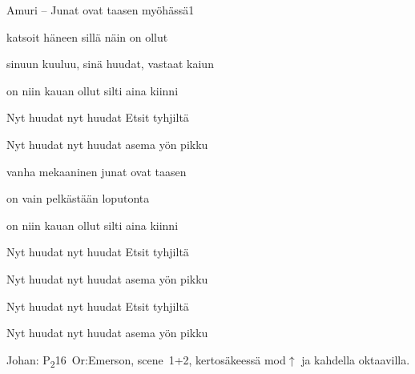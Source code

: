 \documentclass[12pt,a4paper]{article}
\begin{document}
\thispagestyle{empty}
\begin{mysong}{Amuri – Junat ovat taasen myöhässä}{1}


\begin{SBVerse}
   katsoit häneen sillä   näin on
  ollut 

   sinuun kuuluu, sinä   huudat, vastaat
  kaiun 

   on niin kauan ollut   silti aina
  kiinni 
\end{SBVerse}

\begin{SBChorus}
  Nyt huudat  nyt huudat  Etsit
   tyhjiltä 

  Nyt huudat  nyt huudat 
  asema yön pikku
\end{SBChorus}


\begin{SBVerse}
   vanha mekaaninen   junat ovat
  taasen 

   on vain pelkästään   loputonta

   on niin kauan ollut   silti aina
  kiinni 
\end{SBVerse}

\begin{SBChorus}
  Nyt huudat  nyt huudat  Etsit
   tyhjiltä 

  Nyt huudat  nyt huudat 
  asema yön pikku
\end{SBChorus}


\begin{SBChorus}
  Nyt huudat  nyt huudat  Etsit
   tyhjiltä 

  Nyt huudat  nyt huudat 
  asema yön pikku
\end{SBChorus}

{\SBLyricNoteFont Johan: P\textsubscript{2}16~Or:Emerson, scene~1+2,
kertosäkeessä mod$\uparrow$ ja kahdella oktaavilla.}

\end{mysong}
\end{document}
